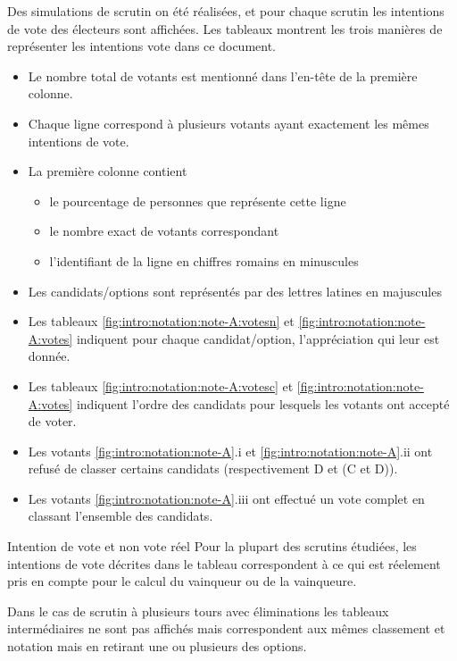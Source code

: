 \documentclass[../report]{subfiles}
\begin{document}
  Des simulations de scrutin on été réalisées, et pour chaque scrutin les intentions de vote des électeurs sont affichées.
  Les tableaux  montrent les trois manières de représenter les intentions vote dans ce document.
  \begin{itemize}
  	\item Le nombre total de votants est mentionné dans l'en-tête de la première colonne.
  	\item Chaque ligne correspond à plusieurs votants ayant exactement les mêmes intentions de vote.
  	\item La première colonne contient 
  	\begin{itemize}
  		\item le pourcentage de personnes que représente cette ligne
  		\item le nombre exact de votants correspondant 
  		\item l'identifiant de la ligne en chiffres romains en minuscules
  	\end{itemize}
  	\item Les candidats/options sont représentés par des lettres latines en majuscules
  	\item Les tableaux \ref{fig:intro:notation:note-A:votesn} et \ref{fig:intro:notation:note-A:votes} indiquent 
  	  pour chaque candidat/option, l'appréciation qui leur est donnée.
  	\item Les tableaux \ref{fig:intro:notation:note-A:votesc} et \ref{fig:intro:notation:note-A:votes} indiquent 
  	  l'ordre des candidats pour lesquels les votants ont accepté de voter.
  	\item Les votants \ref{fig:intro:notation:note-A}.i et \ref{fig:intro:notation:note-A}.ii ont refusé de classer certains candidats 
  	  (respectivement D et (C et D)).
  	\item Les votants \ref{fig:intro:notation:note-A}.iii ont effectué un vote complet en classant l'ensemble des candidats.
  \end{itemize}
  
  
  
  \begin{nota}{Intention de vote et non vote réel}
  	Pour la plupart des scrutins étudiées, les intentions de vote décrites dans le tableau correspondent à ce qui est réelement pris en
  	compte pour le calcul du vainqueur ou de la vainqueure.
  	
  	Dans le cas de scrutin à plusieurs tours avec éliminations les tableaux intermédiaires ne sont pas affichés mais correspondent aux mêmes 
  	classement et notation mais en retirant une ou plusieurs des options.
  \end{nota}
  
\end{document}

